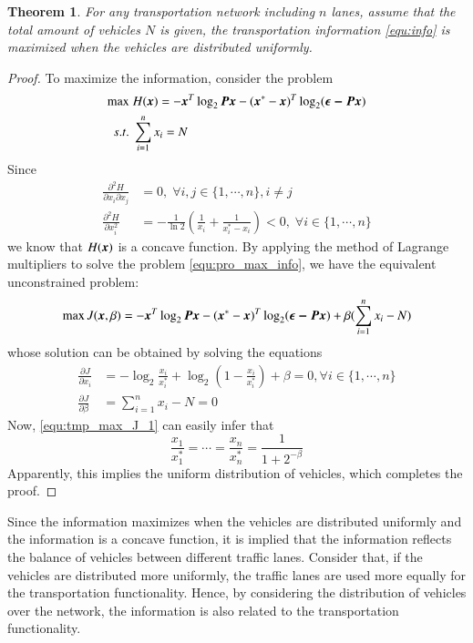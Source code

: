 \documentclass[preprint,authoryear,12pt]{elsarticle}
\renewcommand{\vec}[1]{\mbox{\boldmath$#1$}}
\newcommand{\mat}[1]{\mbox{\boldmath$#1$}}
\newtheorem{thm}{Theorem}
\begin{document}
\begin{thm}\label{thm:info_max}
For any transportation network including $n$ lanes, assume that the total amount of vehicles $N$ is given, the transportation information \eqref{equ:info} is maximized when the vehicles are distributed uniformly.
\end{thm}
\begin{proof}
To maximize the information, consider the problem
\begin{align}\label{equ:pro_max_info}
\max\; &H(\vec{x}) = -\vec{x}^T\log_2\mat{P}\vec{x}
-(\vec{x}^*-\vec{x})^T\log_2(\vec{\epsilon-\mat{P}\vec{x}})\\
s.t.\; &\sum_{i=1}^n x_i = N \nonumber
\end{align}
Since
\begin{align*}
\frac{\partial^2 H}{\partial x_i\partial x_j} &= 0,\;\forall
i,j\in\{1,\cdots,n\},i\neq j\\
\frac{\partial^2 H}{\partial x_i^2} &= -\frac{1}{\ln
2}(\frac{1}{x_i}+\frac{1}{x_i^*-x_i})<0,\;\forall i\in\{1,\cdots,n\}
\end{align*}
we know that $H(\vec{x})$ is a concave function. By applying the method of Lagrange multipliers to solve the problem \eqref{equ:pro_max_info}, we have the equivalent unconstrained problem:
$$\max J(\vec{x},\beta) =
-\vec{x}^T\log_2\mat{P}\vec{x}
-(\vec{x}^*-\vec{x})^T\log_2(\vec{\epsilon-\mat{P}\vec{x}})
+\beta(\sum_{i=1}^n x_i - N)$$
whose solution can be obtained by solving the equations
\begin{align}
\label{equ:tmp_max_J_1}
\frac{\partial J}{\partial x_i} &=
-\log_2\frac{x_i}{x_i^*}+\log_2(1-\frac{x_i}{x_i^*})+\beta =0,
\forall i\in\{1,\cdots,n\}\\
\label{equ:tmp_max_J_2}
\frac{\partial J}{\partial \beta} &= \sum_{i=1}^n x_i - N =0
\end{align}
Now, \eqref{equ:tmp_max_J_1} can easily infer that
$$\frac{x_1}{x_1^*}=\cdots=\frac{x_n}{x_n^*}=\frac{1}{1+2^{-\beta}}
$$
Apparently, this implies the uniform distribution of vehicles, which completes the proof.
\end{proof}

Since the information maximizes when the vehicles are distributed uniformly and the information is a concave function, it is implied that the information reflects the balance of vehicles between different traffic lanes. Consider that, if the vehicles are distributed more uniformly, the traffic lanes are used more equally for the transportation functionality. Hence, by considering the distribution of vehicles over the network, the information is also related to the transportation functionality.
\end{document}
